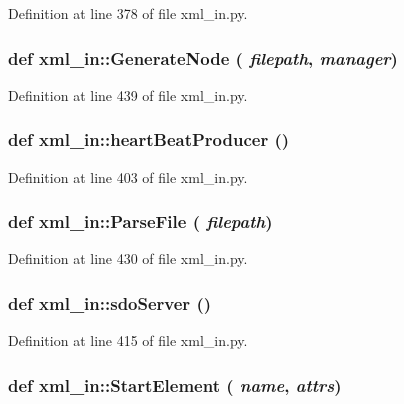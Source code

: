 Definition at line 378 of file xml\_\-in.py.\hypertarget{namespacexml__in_5a1a1b6e0ee2c4143195f17ebc6e5d62}{
\subsubsection[GenerateNode]{\setlength{\rightskip}{0pt plus 5cm}def xml\_\-in::Generate\-Node ( {\em filepath},  {\em manager})}}
\label{namespacexml__in_5a1a1b6e0ee2c4143195f17ebc6e5d62}




Definition at line 439 of file xml\_\-in.py.\hypertarget{namespacexml__in_9ef42f4525a33b7fad6bf277f5f90e8b}{
\subsubsection[heartBeatProducer]{\setlength{\rightskip}{0pt plus 5cm}def xml\_\-in::heart\-Beat\-Producer ()}}
\label{namespacexml__in_9ef42f4525a33b7fad6bf277f5f90e8b}




Definition at line 403 of file xml\_\-in.py.\hypertarget{namespacexml__in_5e641408753c70e0423471a1b4861ec5}{
\subsubsection[ParseFile]{\setlength{\rightskip}{0pt plus 5cm}def xml\_\-in::Parse\-File ( {\em filepath})}}
\label{namespacexml__in_5e641408753c70e0423471a1b4861ec5}




Definition at line 430 of file xml\_\-in.py.\hypertarget{namespacexml__in_c5e8bc321d2c732d14dbfcaddc330462}{
\subsubsection[sdoServer]{\setlength{\rightskip}{0pt plus 5cm}def xml\_\-in::sdo\-Server ()}}
\label{namespacexml__in_c5e8bc321d2c732d14dbfcaddc330462}




Definition at line 415 of file xml\_\-in.py.\hypertarget{namespacexml__in_3b1b832c9581208c332a83f106015aff}{
\subsubsection[StartElement]{\setlength{\rightskip}{0pt plus 5cm}def xml\_\-in::Start\-Element ( {\em name},  {\em attrs})}}
\label{namespacexml__in_3b1b832c9581208c332a83f106015aff}




